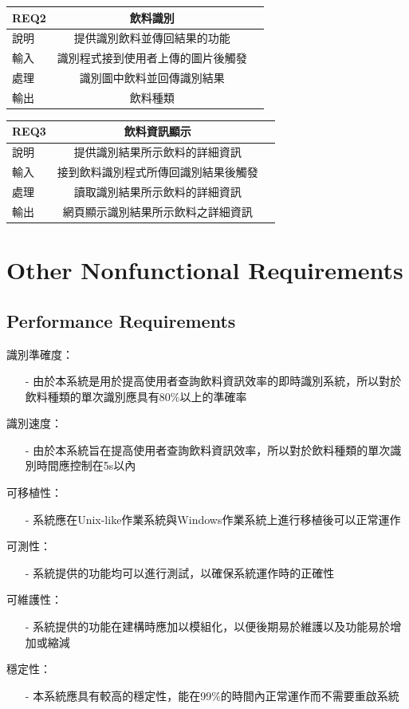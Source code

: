 \documentclass{scrreprt}
\begin{document}
\begin{CJK}{UTF8}{bkai}
\begin{center}
\begin{tabular}{|l|c|r|}\hline
REQ2 & 飲料識別\\ \hline
說明 & 提供識別飲料並傳回結果的功能\\ \hline
輸入 & 識別程式接到使用者上傳的圖片後觸發\\ \hline
處理 & 識別圖中飲料並回傳識別結果\\ \hline
輸出 & 飲料種類\\ \hline
\end{tabular}
\end{center}

\begin{center}
\begin{tabular}{|l|c|r|}\hline
REQ3 & 飲料資訊顯示\\ \hline
說明 & 提供識別結果所示飲料的詳細資訊\\ \hline
輸入 & 接到飲料識別程式所傳回識別結果後觸發\\ \hline
處理 & 讀取識別結果所示飲料的詳細資訊\\ \hline
輸出 & 網頁顯示識別結果所示飲料之詳細資訊\\ \hline
\end{tabular}
\end{center}


\chapter{Other Nonfunctional Requirements}

\section{Performance Requirements}
識別準確度：
\begin{itemize}
\item[-] 由於本系統是用於提高使用者查詢飲料資訊效率的即時識別系統，所以對於飲料種類的單次識別應具有80\%以上的準確率
\end{itemize}
識別速度：
\begin{itemize}
\item[-] 由於本系統旨在提高使用者查詢飲料資訊效率，所以對於飲料種類的單次識別時間應控制在5s以內
\end{itemize}
可移植性：
\begin{itemize}
\item[-] 系統應在Unix-like作業系統與Windows作業系統上進行移植後可以正常運作
\end{itemize}
可測性：
\begin{itemize}
\item[-] 系統提供的功能均可以進行測試，以確保系統運作時的正確性
\end{itemize}
可維護性：
\begin{itemize}
\item[-] 系統提供的功能在建構時應加以模組化，以便後期易於維護以及功能易於增加或縮減
\end{itemize}
穩定性：
\begin{itemize}
\item[-] 本系統應具有較高的穩定性，能在99\%的時間內正常運作而不需要重啟系統
\end{itemize}


\end{CJK}
\end{document}
